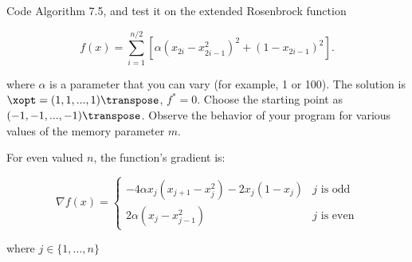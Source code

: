 \begin{problem}\label{prob:03}%
  Code Algorithm 7.5, and test it on the extended Rosenbrock function
  
  \[ f(x) = \sum_{i=1}^{n/2} \left[ \alpha(x_{2i} - x^2_{2i-1})^2 + (1-x_{2i-1})^2 \right] \text{.} \]
  
  where $\alpha$ is a parameter that you can vary (for example, 1 or 100). The solution is $\xopt=(1,1,...,1)\transpose$, $f^{*}=0$. Choose the starting point as $(-1,-1,...,-1)\transpose$. Observe the behavior of your program for various values of the memory parameter $m$.
\end{problem}



For even valued $n$, the function's gradient is:

\[
\nabla f(x) = \left\{
                \begin{array}{cl}
                  -4\alpha x_{j}(x_{j+1} - x^2_{j}) - 2x_{j}(1-x_{j}) & j \text{ is odd}\\
                  2\alpha(x_j - x^{2}_{j-1}) & j \text{ is even}
                \end{array}
              \right.
\]

\noindent
where ${j \in \{1,\ldots,n\}}$